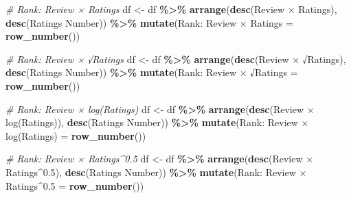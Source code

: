 \documentclass[
]{article}
\newenvironment{Shaded}{\begin{snugshade}}{\end{snugshade}}
\newcommand{\AttributeTok}[1]{\textcolor[rgb]{0.13,0.29,0.53}{#1}}
\newcommand{\CommentTok}[1]{\textcolor[rgb]{0.56,0.35,0.01}{\textit{#1}}}
\newcommand{\FunctionTok}[1]{\textcolor[rgb]{0.13,0.29,0.53}{\textbf{#1}}}
\newcommand{\NormalTok}[1]{#1}
\newcommand{\OtherTok}[1]{\textcolor[rgb]{0.56,0.35,0.01}{#1}}
\newcommand{\SpecialCharTok}[1]{\textcolor[rgb]{0.81,0.36,0.00}{\textbf{#1}}}
\newcommand{\StringTok}[1]{\textcolor[rgb]{0.31,0.60,0.02}{#1}}
\begin{document}
\begin{Shaded}
\begin{Highlighting}[]
\CommentTok{\# Rank: Review × Ratings}
\NormalTok{df }\OtherTok{\textless{}{-}}\NormalTok{ df }\SpecialCharTok{\%\textgreater{}\%}
  \FunctionTok{arrange}\NormalTok{(}\FunctionTok{desc}\NormalTok{(}\StringTok{\textasciigrave{}}\AttributeTok{Review × Ratings}\StringTok{\textasciigrave{}}\NormalTok{), }\FunctionTok{desc}\NormalTok{(}\StringTok{\textasciigrave{}}\AttributeTok{Ratings Number}\StringTok{\textasciigrave{}}\NormalTok{)) }\SpecialCharTok{\%\textgreater{}\%}
  \FunctionTok{mutate}\NormalTok{(}\StringTok{\textasciigrave{}}\AttributeTok{Rank: Review × Ratings}\StringTok{\textasciigrave{}} \OtherTok{=} \FunctionTok{row\_number}\NormalTok{())}

\CommentTok{\# Rank: Review × √Ratings}
\NormalTok{df }\OtherTok{\textless{}{-}}\NormalTok{ df }\SpecialCharTok{\%\textgreater{}\%}
  \FunctionTok{arrange}\NormalTok{(}\FunctionTok{desc}\NormalTok{(}\StringTok{\textasciigrave{}}\AttributeTok{Review × √Ratings}\StringTok{\textasciigrave{}}\NormalTok{), }\FunctionTok{desc}\NormalTok{(}\StringTok{\textasciigrave{}}\AttributeTok{Ratings Number}\StringTok{\textasciigrave{}}\NormalTok{)) }\SpecialCharTok{\%\textgreater{}\%}
  \FunctionTok{mutate}\NormalTok{(}\StringTok{\textasciigrave{}}\AttributeTok{Rank: Review × √Ratings}\StringTok{\textasciigrave{}} \OtherTok{=} \FunctionTok{row\_number}\NormalTok{())}

\CommentTok{\# Rank: Review × log(Ratings)}
\NormalTok{df }\OtherTok{\textless{}{-}}\NormalTok{ df }\SpecialCharTok{\%\textgreater{}\%}
  \FunctionTok{arrange}\NormalTok{(}\FunctionTok{desc}\NormalTok{(}\StringTok{\textasciigrave{}}\AttributeTok{Review × log(Ratings)}\StringTok{\textasciigrave{}}\NormalTok{), }\FunctionTok{desc}\NormalTok{(}\StringTok{\textasciigrave{}}\AttributeTok{Ratings Number}\StringTok{\textasciigrave{}}\NormalTok{)) }\SpecialCharTok{\%\textgreater{}\%}
  \FunctionTok{mutate}\NormalTok{(}\StringTok{\textasciigrave{}}\AttributeTok{Rank: Review × log(Ratings)}\StringTok{\textasciigrave{}} \OtherTok{=} \FunctionTok{row\_number}\NormalTok{())}

\CommentTok{\# Rank: Review × Ratings\^{}0.5}
\NormalTok{df }\OtherTok{\textless{}{-}}\NormalTok{ df }\SpecialCharTok{\%\textgreater{}\%}
  \FunctionTok{arrange}\NormalTok{(}\FunctionTok{desc}\NormalTok{(}\StringTok{\textasciigrave{}}\AttributeTok{Review × Ratings\^{}0.5}\StringTok{\textasciigrave{}}\NormalTok{), }\FunctionTok{desc}\NormalTok{(}\StringTok{\textasciigrave{}}\AttributeTok{Ratings Number}\StringTok{\textasciigrave{}}\NormalTok{)) }\SpecialCharTok{\%\textgreater{}\%}
  \FunctionTok{mutate}\NormalTok{(}\StringTok{\textasciigrave{}}\AttributeTok{Rank: Review × Ratings\^{}0.5}\StringTok{\textasciigrave{}} \OtherTok{=} \FunctionTok{row\_number}\NormalTok{())}


\end{Highlighting}
\end{Shaded}
\end{document}
